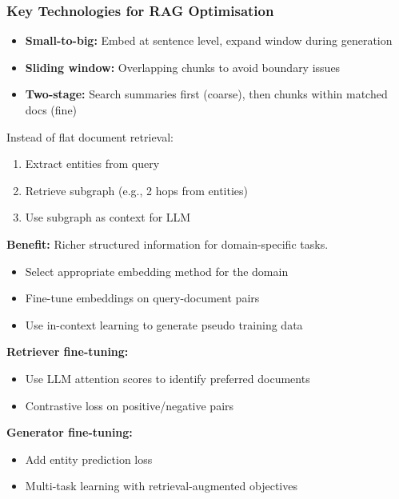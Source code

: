 \bigseparator

\subsubsection{Key Technologies for RAG Optimisation}

\begin{defbox}
\begin{itemize}
  \item \textbf{Small-to-big:} Embed at sentence level, expand window during generation
  \item \textbf{Sliding window:} Overlapping chunks to avoid boundary issues
  \item \textbf{Two-stage:} Search summaries first (coarse), then chunks within matched docs (fine)
\end{itemize}
\end{defbox}

\begin{defbox}
Instead of flat document retrieval:
\begin{enumerate}
  \item Extract entities from query
  \item Retrieve subgraph (e.g., 2 hops from entities)
  \item Use subgraph as context for LLM
\end{enumerate}

\textbf{Benefit:} Richer structured information for domain-specific tasks.
\end{defbox}

\begin{defbox}
\begin{itemize}
  \item Select appropriate embedding method for the domain
  \item Fine-tune embeddings on query-document pairs
  \item Use in-context learning to generate pseudo training data
\end{itemize}
\end{defbox}

\begin{defbox}
\textbf{Retriever fine-tuning:}
\begin{itemize}
  \item Use LLM attention scores to identify preferred documents
  \item Contrastive loss on positive/negative pairs
\end{itemize}

\textbf{Generator fine-tuning:}
\begin{itemize}
  \item Add entity prediction loss
  \item Multi-task learning with retrieval-augmented objectives
\end{itemize}
\end{defbox}

